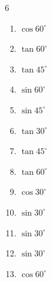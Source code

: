 \begin{multicols}{6}
\begin{enumerate}
  \item $\displaystyle \cos{60^\circ}$


\columnbreak %

  \item $\displaystyle \tan{60^\circ}$


  \item $\displaystyle \tan{45^\circ}$

        \phantom{$\displaystyle =1$}

  \item $\displaystyle \sin{60^\circ}$


  \item $\displaystyle \sin{45^\circ}$


  \item $\displaystyle \tan{30^\circ}$


  \item $\displaystyle \tan{45^\circ}$

        \phantom{$\displaystyle =1$}

  \item $\displaystyle \tan{60^\circ}$


  \item $\displaystyle \cos{30^\circ}$


  \item $\displaystyle \sin{30^\circ}$


  \item $\displaystyle \sin{30^\circ}$


  \item $\displaystyle \sin{30^\circ}$


  \item $\displaystyle \cos{60^\circ}$


\end{enumerate}
\end{multicols}
